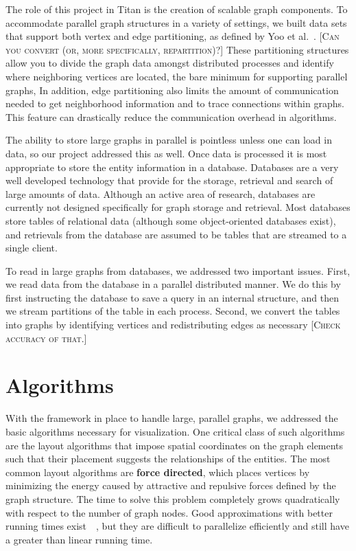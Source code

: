 \documentclass[pdf,12pt,report,strict]{SANDreport}
\newcommand*{\lcite}[1]{~\cite{#1}}
\newcommand*{\scite}[1]{~\cite{#1}}
\newcommand{\titan}{Titan\index{Titan}\xspace}
\newcommand*{\keyterm}[1]{\textbf{#1}}
\newcommand{\sticky}[1]{\textsc{[#1]}}
\begin{document}

The role of this project in \titan is the creation of scalable graph
components.  To accommodate parallel graph structures in a variety of
settings, we built data sets that support both vertex and edge
partitioning, as defined by Yoo et al.\scite{Yoo05}. \sticky{Can
  you convert (or, more specifically, repartition)?}  These partitioning
structures allow you to divide the graph data amongst distributed processes
and identify where neighboring vertices are located, the bare minimum for
supporting parallel graphs, In addition, edge partitioning also limits the
amount of communication needed to get neighborhood information and to trace
connections within graphs.  This feature can drastically reduce the
communication overhead in algorithms.

The ability to store large graphs in parallel is pointless unless one can
load in data, so our project addressed this as well.  Once data is
processed it is most appropriate to store the entity information in a
database.  Databases are a very well developed technology that provide for
the storage, retrieval and search of large amounts of data.  Although an
active area of research, databases are currently not designed specifically
for graph storage and retrieval.  Most databases store tables of relational
data (although some object-oriented databases exist), and retrievals from
the database are assumed to be tables that are streamed to a single client.

To read in large graphs from databases, we addressed two important issues.
First, we read data from the database in a parallel distributed manner.  We
do this by first instructing the database to save a query in an internal
structure, and then we stream partitions of the table in each process.
Second, we convert the tables into graphs by identifying vertices and
redistributing edges as necessary \sticky{Check accuracy of that.}

\section{Algorithms}


With the framework in place to handle large, parallel graphs, we addressed
the basic algorithms necessary for visualization.  One critical class of
such algorithms are the layout algorithms that impose spatial coordinates
on the graph elements such that their placement suggests the relationships
of the entities.  The most common layout algorithms are
\keyterm{force directed}, which places
vertices by minimizing the energy caused by attractive and repulsive forces
defined by the graph structure.  The time to solve this problem completely
grows quadratically with respect to the number of graph nodes.  Good
approximations with better running times exist~\lcite{Hachul04}, but they
are difficult to parallelize efficiently and still have a greater than
linear running time.
\end{document}
